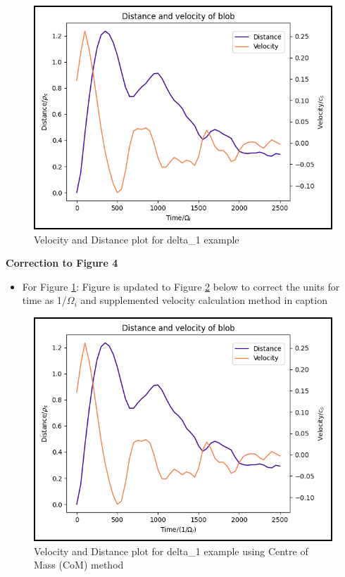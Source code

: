 \documentclass{article}
\begin{document}
\begin{arrowlist}
    \begin{figure}[H]
    \centering
        \includegraphics[height=0.4\textheight]{./Fig/Fig3 vel plot_v2.png}
        \normalsize{\caption{Velocity and Distance plot for delta\_1 example}
        \label{fig:fig4}}
    \end{figure}   

\item \textbf{Correction to Figure 4}
    \begin{itemize}
        \item For Figure \ref{fig:fig4}: Figure is updated to Figure \ref{fig:fig5} below to correct the units for time as 1/$\Omega_i$ and supplemented velocity calculation method in caption
    \end{itemize}

    \begin{figure}[H]
    \centering
        \includegraphics[height=0.4\textheight]{./Fig/Fig3 vel plot_v3.png}
        \normalsize{\caption{Velocity and Distance plot for delta\_1 example using Centre of Mass (CoM) method}
        \label{fig:fig5}}
    \end{figure}   


\end{arrowlist}
\end{document}

